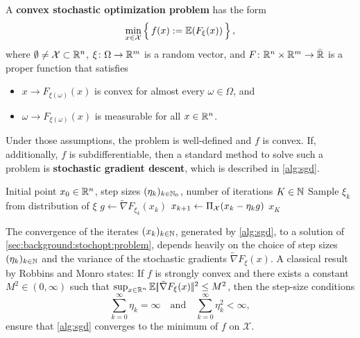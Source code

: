 
A \textbf{convex stochastic optimization problem} has the form
\begin{equation}
    \label{sec:background:stochopt:problem}
    \min_{x\in\mathcal{X}} \Big\{\, f(x) := \mathbb{E}(F_\xi(x)) \,\Big\}\,,
\end{equation}
where $\emptyset \neq \mathcal{X}\subset\mathbb{R}^n$, $\xi\colon\Omega\to\mathbb{R}^m$ is a random vector,
and $F\colon\mathbb{R}^n \times \mathbb{R}^m \to \bar{\mathbb{R}}$ is a proper function that satisfies
\begin{itemize}
    \item[-] $x\to F_{\xi(\omega)}(x)$ is convex for almost every $\omega\in\Omega$, and
    \item[-] $\omega\to F_{\xi(\omega)}(x)$ is measurable for all $x\in\mathbb{R}^n$.
\end{itemize}
Under those assumptions, the problem is well-defined and $f$ is convex.
If, additionally, $f$ is subdifferentiable, then
a standard method to solve such a problem is \textbf{stochastic gradient descent}, which is described in \cref{alg:sgd}.
\begin{algorithm}[t]
\caption{Stochastic Gradient Descent (SGD)}
\label{alg:sgd}
\begin{algorithmic}[1] %
\Require Initial point $x_0\in\mathbb{R}^n$, step sizes $(\eta_k)_{k\in\mathbb{N}_0}$, number of iterations $K\in\mathbb{N}$
    \State Sample $\xi_k$ from distribution of $\xi$
    \State $g \gets \tilde{\nabla} F_{\xi_k}(x_k)$
    \State $x_{k+1} \gets \operatorname{\Pi_\mathcal{X}}(x_k - \eta_k g)$
\EndFor
\State \Return $x_{K}$
\end{algorithmic}
\end{algorithm}

The convergence of the iterates $(x_k)_{k\in\mathbb{N}}$,
generated by \cref{alg:sgd}, to a solution of \eqref{sec:background:stochopt:problem},
depends heavily on the choice of step sizes $(\eta_k)_{k\in\mathbb{N}}$ and the variance of the stochastic gradients
$\tilde{\nabla} F_{\xi}(x)$.
A classical result by
Robbins and Monro \cite{robbins1951stochastic} states: If $f$ is strongly convex and there exists a constant
$M^2 \in (0, \infty)$ such that $\sup_{x\in\mathbb{R}^n} \mathbb{E}|\!|\tilde{\nabla} F_{\xi}(x)|\!|^2 \leq M^2$, then the
step-size conditions
\[
    \sum_{k=0}^\infty \eta_k = \infty \quad\text{and}\quad \sum_{k=0}^\infty \eta_k^2 < \infty,
\]
ensure that \cref{alg:sgd} converges to the minimum of $f$ on $\mathcal{X}$.

